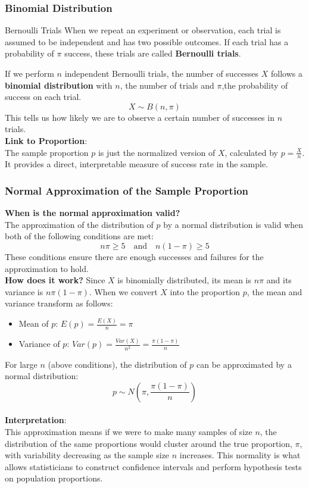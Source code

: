 \documentclass[10pt, total={6in, 8in}]{extarticle}
\begin{document}
\subsubsection{Binomial Distribution}
\begin{conceptbox}{Bernoulli Trials}{}
    When we repeat an experiment or observation, each trial is assumed to be independent and has two possible outcomes. If each trial has a probability of $\pi$ success, these trials are called \textbf{Bernoulli trials}.
\end{conceptbox}

\noindent If we perform $n$ independent Bernoulli trials, the number of successes $X$ follows a \textbf{binomial distribution} with $n$, the number of trials and $\pi$,the probability of success on each trial.
$$X \sim B(n, \pi)$$
This tells us how likely we are to observe a certain number of successes in $n$ trials.\\[2ex]
\textbf{Link to Proportion}: \\
The sample proportion $p$ is just the normalized version of $X$, calculated by $p = \frac{X}{n}$. It provides a direct, interpretable measure of success rate in the sample.

\subsubsection{Normal Approximation of the Sample Proportion}
\textbf{When is the normal approximation valid?}\\
The approximation of the distribution of $p$ by a normal distribution is valid when both of the following conditions are met:
$$n\pi \geq 5 \quad \text{and} \quad n(1 - \pi) \geq 5$$
These conditions ensure there are enough successes and failures for the approximation to hold. \\[2ex]
\textbf{How does it work?}
Since $X$ is binomially distributed, its mean is $n\pi$ and its variance is $n\pi(1 - \pi)$. When we convert $X$ into the proportion $p$, the mean and variance transform as follows:
\begin{itemize}
    \item Mean of $p$: $E(p) = \frac{E(X)}{n} = \pi$
    \item Variance of $p$: $Var(p) = \frac{Var(X)}{n^2} = \frac{\pi(1 - \pi)}{n}$
\end{itemize}
For large $n$ (above conditions), the distribution of $p$ can be approximated by a normal distribution:
$$p \sim N\left(\pi, \frac{\pi(1 - \pi)}{n}\right)$$\\
\textbf{Interpretation}: \\
This approximation means if we were to make many samples of size $n$, the distribution of the same proportions would cluster around the true proportion, $\pi$, with variability decreasing as the sample size $n$ increases. This normality is what allows statisticians to construct confidence intervals and perform hypothesis tests on population proportions.
\end{document}
